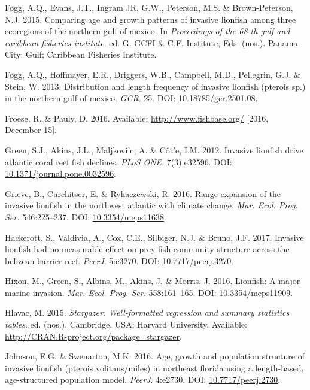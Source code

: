\documentclass[12pt,]{article}
\begin{document}
\hypertarget{ref-fogg_2015}{}
Fogg, A.Q., Evans, J.T., Ingram JR, G.W., Peterson, M.S. \&
Brown-Peterson, N.J. 2015. Comparing age and growth patterns of invasive
lionfish among three ecoregions of the northern gulf of mexico. In
\emph{Proceedings of the 68 th gulf and caribbean fisheries institute}.
ed. G. GCFI \& C.F. Institute, Eds. (nos.). Panama City: Gulf; Caribbean
Fisheries Institute.

\hypertarget{ref-fogg_2013}{}
Fogg, A.Q., Hoffmayer, E.R., Driggers, W.B., Campbell, M.D., Pellegrin,
G.J. \& Stein, W. 2013. Distribution and length frequency of invasive
lionfish (pterois sp.) in the northern gulf of mexico. \emph{GCR}. 25.
DOI: \href{https://doi.org/10.18785/gcr.2501.08}{10.18785/gcr.2501.08}.

\hypertarget{ref-froese_website_2016}{}
Froese, R. \& Pauly, D. 2016. Available: \url{http://www.fishbase.org/}
{[}2016, December 15{]}.

\hypertarget{ref-green_2012}{}
Green, S.J., Akins, J.L., Maljkovi\a'c, A. \& Côt\a'e, I.M. 2012.
Invasive lionfish drive atlantic coral reef fish declines. \emph{PLoS
ONE}. 7(3):e32596. DOI:
\href{https://doi.org/10.1371/journal.pone.0032596}{10.1371/journal.pone.0032596}.

\hypertarget{ref-grieve_2016}{}
Grieve, B., Curchitser, E. \& Rykaczewski, R. 2016. Range expansion of
the invasive lionfish in the northwest atlantic with climate change.
\emph{Mar. Ecol. Prog. Ser.} 546:225--237. DOI:
\href{https://doi.org/10.3354/meps11638}{10.3354/meps11638}.

\hypertarget{ref-hackerott_2017}{}
Hackerott, S., Valdivia, A., Cox, C.E., Silbiger, N.J. \& Bruno, J.F.
2017. Invasive lionfish had no measurable effect on prey fish community
structure across the belizean barrier reef. \emph{PeerJ}. 5:e3270. DOI:
\href{https://doi.org/10.7717/peerj.3270}{10.7717/peerj.3270}.

\hypertarget{ref-hixon_2016}{}
Hixon, M., Green, S., Albins, M., Akins, J. \& Morris, J. 2016.
Lionfish: A major marine invasion. \emph{Mar. Ecol. Prog. Ser.}
558:161--165. DOI:
\href{https://doi.org/10.3354/meps11909}{10.3354/meps11909}.

\hypertarget{ref-stargazer_2015}{}
Hlavac, M. 2015. \emph{Stargazer: Well-formatted regression and summary
statistics tables}. ed. (nos.). Cambridge, USA: Harvard University.
Available: \url{http://CRAN.R-project.org/package=stargazer}.

\hypertarget{ref-johnson_2016}{}
Johnson, E.G. \& Swenarton, M.K. 2016. Age, growth and population
structure of invasive lionfish (pterois volitans/miles) in northeast
florida using a length-based, age-structured population model.
\emph{PeerJ}. 4:e2730. DOI:
\href{https://doi.org/10.7717/peerj.2730}{10.7717/peerj.2730}.
\end{document}
